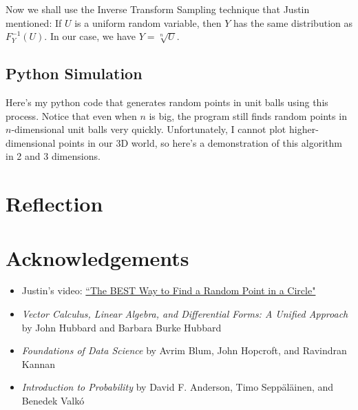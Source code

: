 \documentclass{article}
\begin{document}
Now we shall use the Inverse Transform Sampling technique that Justin mentioned: If $U$ is a uniform random variable, then $Y$ has the same distribution as $F_Y^{-1}(U)$. In our case, we have $Y = \sqrt[n]{U}$.

\subsection{Python Simulation}

Here's my python code that generates random points in unit balls using this process. Notice that even when $n$ is big, the program still finds random points in $n$-dimensional unit balls very quickly. Unfortunately, I cannot plot higher-dimensional points in our 3D world, so here's a demonstration of this algorithm in 2 and 3 dimensions.


\section{Reflection}

\section{Acknowledgements}

\begin{itemize}
  \item Justin's video: \href{https://www.youtube.com/watch?v=4y_nmpv-9lI&list=PLnQX-jgAF5pTkwtUuVpqS5tuWmJ-6ZM-Z&index=6&t=3s}{``The BEST Way to Find a Random Point in a Circle"}
  \item \textit{Vector Calculus, Linear Algebra, and Differential Forms: A Unified Approach} by John Hubbard and Barbara Burke Hubbard
  \item \textit{Foundations of Data Science} by Avrim Blum, John Hopcroft, and Ravindran Kannan
  \item \textit{Introduction to Probability} by David F. Anderson, Timo Sepp\"{a}l\"{a}inen, and Benedek Valk\'{o}
\end{itemize}
\end{document}

